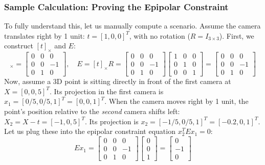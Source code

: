\documentclass[12pt]{article}
\begin{document}
\subsubsection{Sample Calculation: Proving the Epipolar Constraint}
To fully understand this, let us manually compute a scenario. Assume the camera translates right by 1 unit: $t = [1, 0, 0]^T$, with no rotation ($R = I_{3 \times 3}$). 
First, we construct $[t]_{\times}$ and $E$:
\begin{equation}
    [t]_{\times} = \begin{bmatrix} 0 & 0 & 0 \\ 0 & 0 & -1 \\ 0 & 1 & 0 \end{bmatrix}, \quad E = [t]_{\times} R = \begin{bmatrix} 0 & 0 & 0 \\ 0 & 0 & -1 \\ 0 & 1 & 0 \end{bmatrix} \begin{bmatrix} 1 & 0 & 0 \\ 0 & 1 & 0 \\ 0 & 0 & 1 \end{bmatrix} = \begin{bmatrix} 0 & 0 & 0 \\ 0 & 0 & -1 \\ 0 & 1 & 0 \end{bmatrix}
\end{equation}
Now, assume a 3D point is sitting directly in front of the first camera at $X = [0, 0, 5]^T$. Its projection in the first camera is $x_1 = [0/5, 0/5, 1]^T = [0, 0, 1]^T$.
When the camera moves right by 1 unit, the point's position relative to the \textit{second} camera shifts left: $X_2 = X - t = [-1, 0, 5]^T$. Its projection is $x_2 = [-1/5, 0/5, 1]^T = [-0.2, 0, 1]^T$.
Let us plug these into the epipolar constraint equation $x_2^T E x_1 = 0$:
\begin{equation}
    E x_1 = \begin{bmatrix} 0 & 0 & 0 \\ 0 & 0 & -1 \\ 0 & 1 & 0 \end{bmatrix} \begin{bmatrix} 0 \\ 0 \\ 1 \end{bmatrix} = \begin{bmatrix} 0 \\ -1 \\ 0 \end{bmatrix}
\end{equation}
\end{document}

